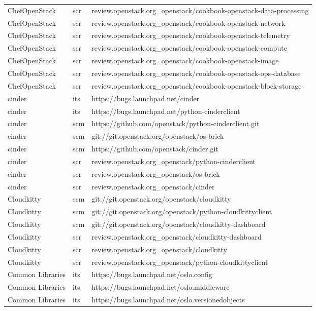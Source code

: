 \begin{center}
\begin{longtable}{|p{4cm}|p{1cm}|p{10cm}|}
ChefOpenStack&scr&review.openstack.org\_openstack/cookbook-openstack-data-processing\\ 
ChefOpenStack&scr&review.openstack.org\_openstack/cookbook-openstack-network\\ 
ChefOpenStack&scr&review.openstack.org\_openstack/cookbook-openstack-telemetry\\ 
ChefOpenStack&scr&review.openstack.org\_openstack/cookbook-openstack-compute\\ 
ChefOpenStack&scr&review.openstack.org\_openstack/cookbook-openstack-image\\ 
ChefOpenStack&scr&review.openstack.org\_openstack/cookbook-openstack-ops-database\\ 
ChefOpenStack&scr&review.openstack.org\_openstack/cookbook-openstack-block-storage\\ 
cinder&its&https://bugs.launchpad.net/cinder\\ 
cinder&its&https://bugs.launchpad.net/python-cinderclient\\ 
cinder&scm&https://github.com/openstack/python-cinderclient.git\\ 
cinder&scm&git://git.openstack.org/openstack/os-brick\\ 
cinder&scm&https://github.com/openstack/cinder.git\\ 
cinder&scr&review.openstack.org\_openstack/python-cinderclient\\ 
cinder&scr&review.openstack.org\_openstack/os-brick\\ 
cinder&scr&review.openstack.org\_openstack/cinder\\ 
Cloudkitty&scm&git://git.openstack.org/openstack/cloudkitty\\ 
Cloudkitty&scm&git://git.openstack.org/openstack/python-cloudkittyclient\\ 
Cloudkitty&scm&git://git.openstack.org/openstack/cloudkitty-dashboard\\ 
Cloudkitty&scr&review.openstack.org\_openstack/cloudkitty-dashboard\\ 
Cloudkitty&scr&review.openstack.org\_openstack/cloudkitty\\ 
Cloudkitty&scr&review.openstack.org\_openstack/python-cloudkittyclient\\ 
Common Libraries&its&https://bugs.launchpad.net/oslo.config\\ 
Common Libraries&its&https://bugs.launchpad.net/oslo.middleware\\ 
Common Libraries&its&https://bugs.launchpad.net/oslo.versionedobjects\\ 

\end{longtable}
\end{center}
